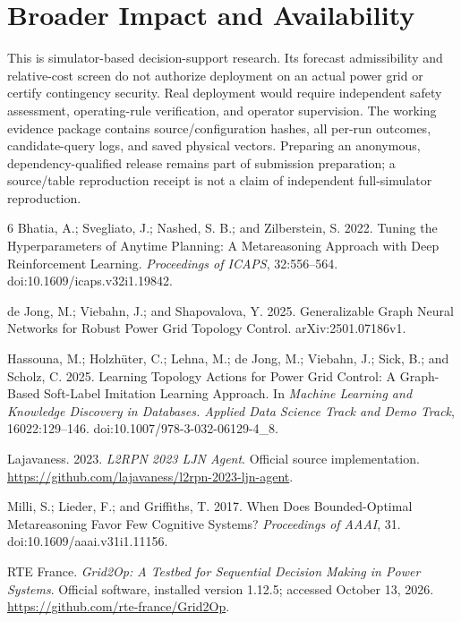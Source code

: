 \section{Broader Impact and Availability}

This is simulator-based decision-support research. Its forecast admissibility and relative-cost screen do not authorize deployment on an actual power grid or certify contingency security. Real deployment would require independent safety assessment, operating-rule verification, and operator supervision. The working evidence package contains source/configuration hashes, all per-run outcomes, candidate-query logs, and saved physical vectors. Preparing an anonymous, dependency-qualified release remains part of submission preparation; a source/table reproduction receipt is not a claim of independent full-simulator reproduction.


\begin{thebibliography}{6}
Bhatia, A.; Svegliato, J.; Nashed, S. B.; and Zilberstein, S. 2022. Tuning the Hyperparameters of Anytime Planning: A Metareasoning Approach with Deep Reinforcement Learning. \emph{Proceedings of ICAPS}, 32:556--564. doi:10.1609/icaps.v32i1.19842.

de Jong, M.; Viebahn, J.; and Shapovalova, Y. 2025. Generalizable Graph Neural Networks for Robust Power Grid Topology Control. arXiv:2501.07186v1.

Hassouna, M.; Holzh\"uter, C.; Lehna, M.; de Jong, M.; Viebahn, J.; Sick, B.; and Scholz, C. 2025. Learning Topology Actions for Power Grid Control: A Graph-Based Soft-Label Imitation Learning Approach. In \emph{Machine Learning and Knowledge Discovery in Databases. Applied Data Science Track and Demo Track}, 16022:129--146. doi:10.1007/978-3-032-06129-4\_8.

Lajavaness. 2023. \emph{L2RPN 2023 LJN Agent}. Official source implementation. \url{https://github.com/lajavaness/l2rpn-2023-ljn-agent}.

Milli, S.; Lieder, F.; and Griffiths, T. 2017. When Does Bounded-Optimal Metareasoning Favor Few Cognitive Systems? \emph{Proceedings of AAAI}, 31. doi:10.1609/aaai.v31i1.11156.

RTE France. \emph{Grid2Op: A Testbed for Sequential Decision Making in Power Systems}. Official software, installed version 1.12.5; accessed October 13, 2026. \url{https://github.com/rte-france/Grid2Op}.
\end{thebibliography}


